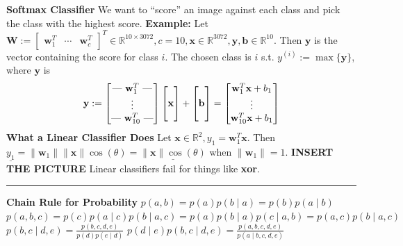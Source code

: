 \documentclass{article}
\newcommand{\R}{\mathbb{R}}
\newcommand{\x}{\bf{x}}
\newcommand{\w}{\bf{w}}
\newcommand{\y}{\bf{y}}
\renewcommand{\b}{\bf{b}}
\newcommand{\W}{\bf{W}}
\renewcommand{\bf}[1]{\textbf{{#1}}}
\newcommand{\ul}[1]{\underline{{#1}}}
\begin{document}
\begin{small}
\bf{Softmax Classifier}
\newline
We want to ``score'' an image against each class and pick the class with the highest score.
\newline
\bf{Example:} Let 
$
\W := 
\begin{bmatrix}
    \w_1^T & \cdots & \w_c^T
\end{bmatrix}^T
\in \R^{10 \times 3072},
c = 10, \x \in \R^{3072}, \y, \b \in \R^{10}
$. Then $\y$ is the vector containing the score for class $i$. The chosen class is $i$ s.t. 
$y^{(i)} := \max\{\y\}$, where $\y$ is
\vspace{-1em}
\[
    \y := 
    \begin{bmatrix}
        \text{--- } \w_1^T \text{ ---} \\
        \vdots \\
        \text{--- } \w_{10}^T \text{ ---}
    \end{bmatrix}
    \begin{bmatrix}
        \\
        \x \\
        \\
    \end{bmatrix}
    +
    \begin{bmatrix}
        \\
        \b \\
        \\
    \end{bmatrix}
    =
    \begin{bmatrix}
        \w_1^T \x + b_1 \\
        \vdots \\
        \w_{10}^T \x + b_1 \\
    \end{bmatrix}
    \vspace{-1em}
\]
\bf{What a Linear Classifier Does}
\newline
Let $\x \in \R^2, y_1 = \w_1^T \x$. Then 
$
\ul{y_1}
= \|\w_1\| \|\x\| \cos(\theta) 
= \ul{\|\x\| \cos(\theta)}$ when $\|\w_1\| = 1$.
\newline
\bf{INSERT THE PICTURE}
\newline
Linear classifiers fail for things like \bf{xor}.
\hrule
\vspace{0.1em}

\bf{Chain Rule for Probability}
\newline
$p(a, b) = p(a)p(b \mid a) = p(b)p(a \mid b)$
\newline
$p(a, b, c) 
= p(c)p(a \mid c)p(b \mid a, c)
= p(a)p(b \mid a)p(c \mid a, b)
= p(a, c)p(b \mid a, c)
$
\newline
$p(b, c \mid d, e) = \frac{p(b, c, d, e)}{p(d)p(e \mid d)}$
\newline
$p(d \mid e) p (b, c \mid d, e) = \frac{p(a, b, c, d, e)}{p(a \mid b, c, d, e)}$


\end{small}
\end{document}
